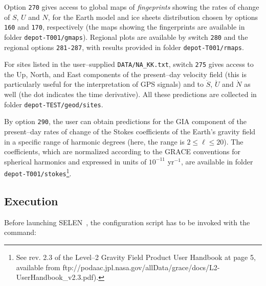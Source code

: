 \documentclass[11pt,fleqn,a4paper,titlepage]{article}
\newcommand\selen{\textsf{SELEN~}}
\begin{document}
Option \texttt{270} gives
access to global maps of \textit{fingeprints} showing the rates of change of $S$, $U$ and
$N$, for the Earth model and ice sheets distribution chosen by options \texttt{160} and 
\texttt{170}, respectively (the maps showing the fingerprints are available
in folder \texttt{depot-T001/gmaps}). Regional plots are available by switch 
\texttt{280} and the regional options \texttt{281-287}, with results provided in 
folder \texttt{depot-T001/rmaps}. 

For sites listed in the user--supplied \texttt{DATA/NA\_KK.txt}, switch \texttt{275} 
gives access to the Up, North, and East components of the present--day velocity 
field (this is particularly useful for the interpretation of GPS signals) and to 
$\dot S$, $\dot U$ and $\dot N$ as well (the dot indicates the time derivative).  All 
these predictions are collected in folder \texttt{depot-TEST/geod/sites}. 

By option \texttt{290}, the user can obtain predictions for the GIA component 
of the present--day rates
of change of the Stokes coefficients of the Earth's gravity field in a specific range of
harmonic degrees (here, the range is $2\le \ell \le 20$). The coefficients, which are 
normalized according to the GRACE conventions for spherical harmonics and expressed
in units of $10^{-11}$ yr$^{-1}$, are 
available in folder \texttt{depot-T001/stokes}\footnote{See rev. 2.3 of the Level--2 
Gravity Field Product User Handbook at page 5, available from 
ftp://podaac.jpl.nasa.gov/allData/grace/docs/L2-UserHandbook\_v2.3.pdf).}. 


\subsection{Execution}\label{sec:execution}

\noindent Before launching \selen, the configuration script has to be invoked with the command:
\end{document}
